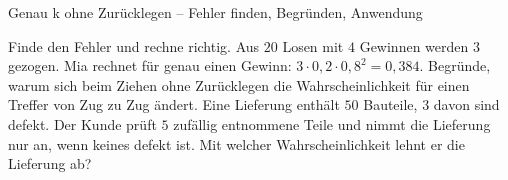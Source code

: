 \begin{aufgabe}{Genau k ohne Zurücklegen – Fehler finden, Begründen, Anwendung}
\begin{teile}
\teil Finde den Fehler und rechne richtig. Aus $20$ Losen mit $4$ Gewinnen werden $3$ gezogen. Mia rechnet für genau einen Gewinn: $3 \cdot 0{,}2 \cdot 0{,}8^2 = 0{,}384$.
\teil Begründe, warum sich beim Ziehen ohne Zurücklegen die Wahrscheinlichkeit für einen Treffer von Zug zu Zug ändert.
\teil Eine Lieferung enthält $50$ Bauteile, $3$ davon sind defekt. Der Kunde prüft $5$ zufällig entnommene Teile und nimmt die Lieferung nur an, wenn keines defekt ist. Mit welcher Wahrscheinlichkeit lehnt er die Lieferung ab?
\end{teile}
\end{aufgabe}
